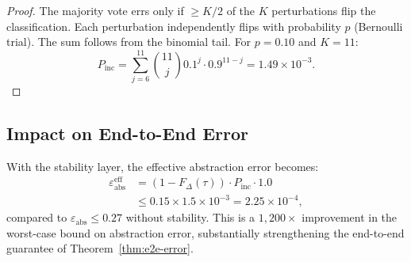\documentclass[11pt]{article}
\begin{document}
\begin{proof}
The majority vote errs only if ${\ge}K/2$ of the $K$ perturbations
flip the classification.  Each perturbation independently flips with
probability $p$ (Bernoulli trial).  The sum follows from the
binomial tail.  For $p = 0.10$ and $K = 11$:
\[
  P_{\mathrm{inc}} = \sum_{j=6}^{11} \binom{11}{j} 0.1^j \cdot 0.9^{11-j}
  = 1.49 \times 10^{-3}.
\]
\end{proof}

\subsection{Impact on End-to-End Error}

With the stability layer, the effective abstraction error becomes:
\begin{align*}
  \varepsilon_{\mathrm{abs}}^{\mathrm{eff}} &=
    (1 - F_\Delta(\tau)) \cdot P_{\mathrm{inc}} \cdot 1.0 \\
    &\le 0.15 \times 1.5 \times 10^{-3} = 2.25 \times 10^{-4},
\end{align*}
compared to $\varepsilon_{\mathrm{abs}} \le 0.27$ without stability.
This is a $1{,}200{\times}$ improvement in the worst-case bound on
abstraction error, substantially strengthening the end-to-end
guarantee of Theorem~\ref{thm:e2e-error}.
\end{document}
